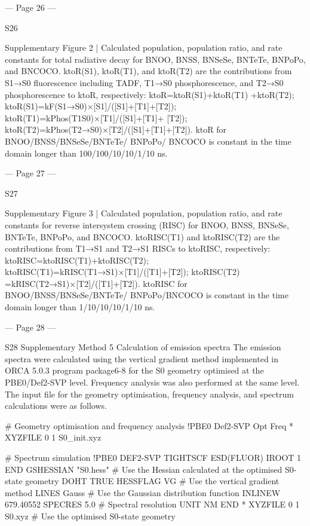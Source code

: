  
 
 


--- Page 26 ---
 
S26 
 
 
Supplementary Figure 2 | Calculated population, population ratio, and rate constants for total 
radiative decay for BNOO, BNSS, BNSeSe, BNTeTe, BNPoPo, and BNCOCO. ktoR(S1), 
ktoR(T1), and ktoR(T2) are the contributions from S1→S0 fluorescence including TADF, T1→S0 
phosphorescence, and T2→S0 phosphorescence to ktoR, respectively: ktoR=ktoR(S1)+ktoR(T1) 
+ktoR(T2); ktoR(S1)=kF(S1→S0)×[S1]/([S1]+[T1]+[T2]); ktoR(T1)=kPhos(T1S0)×[T1]/([S1]+[T1]+ 
[T2]); ktoR(T2)=kPhos(T2→S0)×[T2]/([S1]+[T1]+[T2]). ktoR for BNOO/BNSS/BNSeSe/BNTeTe/ 
BNPoPo/ BNCOCO is constant in the time domain longer than 100/100/10/10/1/10 ns. 


--- Page 27 ---
 
S27 
 
 
Supplementary Figure 3 | Calculated population, population ratio, and rate constants for 
reverse intersystem crossing (RISC) for BNOO, BNSS, BNSeSe, BNTeTe, BNPoPo, and 
BNCOCO. ktoRISC(T1) and ktoRISC(T2) are the contributions from T1→S1 and T2→S1 RISCs to 
ktoRISC, respectively: ktoRISC=ktoRISC(T1)+ktoRISC(T2); ktoRISC(T1)=kRISC(T1→S1)×[T1]/([T1]+[T2]); 
ktoRISC(T2) =kRISC(T2→S1)×[T2]/([T1]+[T2]). ktoRISC for BNOO/BNSS/BNSeSe/BNTeTe/ 
BNPoPo/BNCOCO is constant in the time domain longer than 1/10/10/10/1/10 ns. 


--- Page 28 ---
 
S28 
Supplementary Method 5 
Calculation of emission spectra 
The emission spectra were calculated using the vertical gradient method implemented in 
ORCA 5.0.3 program package6-8 for the S0 geometry optimised at the PBE0/Def2-SVP level. 
Frequency analysis was also performed at the same level. The input file for the geometry 
optimisation, frequency analysis, and spectrum calculations were as follows. 
 
# Geometry optimisation and frequency analysis 
!PBE0 Def2-SVP Opt Freq 
* XYZFILE 0 1 S0_init.xyz 
 
# Spectrum simulation 
!PBE0 DEF2-SVP TIGHTSCF ESD(FLUOR) 
IROOT 1 
END 
GSHESSIAN "S0.hess" # Use the Hessian calculated at the optimised S0-state geometry 
DOHT TRUE 
HESSFLAG VG # Use the vertical gradient method 
LINES Gauss # Use the Gaussian distribution function 
INLINEW 679.40552 
SPECRES 5.0 # Spectral resolution 
UNIT NM 
END 
* XYZFILE 0 1 S0.xyz # Use the optimised S0-state geometry 
 
